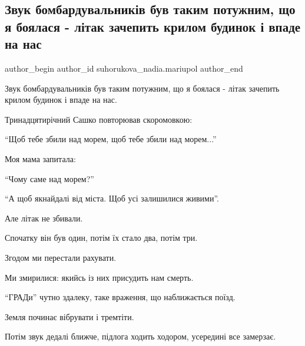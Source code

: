  
 
 
 
 

\subsection{Звук бомбардувальників був таким потужним, що я боялася - літак зачепить крилом будинок і впаде на нас}
\label{sec:28_02_2023.fb.suhorukova_nadia.mariupol.1.zvuk_bombarduvalnik_}

\ifcmt
 author_begin
   author_id suhorukova_nadia.mariupol
 author_end
\fi

Звук бомбардувальників був таким потужним, що я боялася - літак зачепить крилом
будинок і впаде на нас. 

Тринадцятирічний Сашко повторював скоромовкою: 

\enquote{Щоб тебе збили над морем, щоб тебе збили над морем...}

Моя мама запитала:

\enquote{Чому саме над морем?}

\enquote{А щоб якнайдалі від міста. Щоб усі залишилися живими}. 

Але літак не збивали. 

Спочатку він був один, потім їх стало два, потім три. 

Згодом ми перестали рахувати. 

Ми змирилися: якийсь із них присудить нам смерть.

\enquote{ГРАДи} чутно здалеку, таке враження, що наближається поїзд. 

Земля починає вібрувати і тремтіти. 

Потім звук дедалі ближче, підлога ходить ходором, усередині все замерзає. 

